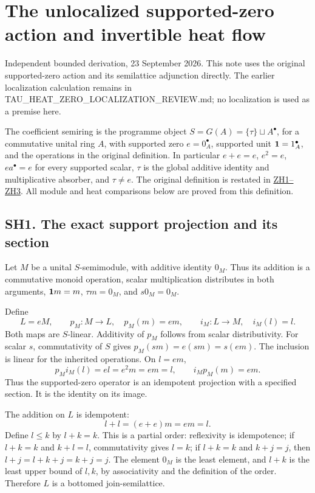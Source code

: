 \documentclass[
]{article}
\author{}
\date{}
\begin{document}
\section{The unlocalized supported-zero action and invertible heat
flow}\label{the-unlocalized-supported-zero-action-and-invertible-heat-flow}

Independent bounded derivation, 23 September 2026. This note uses the
original supported-zero action and its semilattice adjunction directly.
The earlier localization calculation remains in
TAU\_HEAT\_ZERO\_LOCALIZATION\_REVIEW.md; no localization is used as a
premise here.

The coefficient semiring is the programme object
\(S=G(A)=\{\tau\}\sqcup A^\bullet\), for a commutative unital ring
\(A\), with supported zero \(e=0_A^\bullet\), supported unit
\({\bf1}=1_A^\bullet\), and the operations in the original definition.
In particular \(e+e=e\), \(e^2=e\), \(ea^\bullet=e\) for every supported
scalar, \(\tau\) is the global additive identity and multiplicative
absorber, and \(\tau\ne e\). The original definition is restated in
\href{../SUPPORTED_ZERO_HEAT_IDENTITY_DERIVATION.md}{ZH1--ZH3}. All
module and heat comparisons below are proved from this definition.

\subsection{SH1. The exact support projection and its
section}\label{sh1.-the-exact-support-projection-and-its-section}

Let \(M\) be a unital \(S\)-semimodule, with additive identity \(0_M\).
Thus its addition is a commutative monoid operation, scalar
multiplication distributes in both arguments, \({\bf1}m=m\),
\(\tau m=0_M\), and \(s0_M=0_M\).

Define \[
L=eM,\qquad p_M:M\longrightarrow L,\quad p_M(m)=em,
\qquad i_M:L\longrightarrow M,\quad i_M(l)=l.
\tag{SH1}
\] Both maps are \(S\)-linear. Additivity of \(p_M\) follows from scalar
distributivity. For scalar \(s\), commutativity of \(S\) gives
\(p_M(sm)=e(sm)=s(em)\). The inclusion is linear for the inherited
operations. On \(l=em\), \[
p_Mi_M(l)=el=e^2m=em=l,
\qquad
i_Mp_M(m)=em.
\tag{SH2}
\] Thus the supported-zero operator is an idempotent projection with a
specified section. It is the identity on its image.

The addition on \(L\) is idempotent: \[
l+l=(e+e)m=em=l.
\] Define \(l\le k\) by \(l+k=k\). This is a partial order: reflexivity
is idempotence; if \(l+k=k\) and \(k+l=l\), commutativity gives \(l=k\);
if \(l+k=k\) and \(k+j=j\), then \(l+j=l+k+j=k+j=j\). The element
\(0_M\) is the least element, and \(l+k\) is the least upper bound of
\(l,k\), by associativity and the definition of the order. Therefore
\(L\) is a bottomed join-semilattice.
\end{document}

